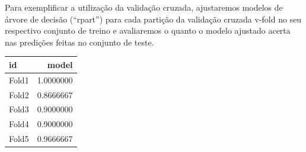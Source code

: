 \documentclass[
  a4paperpaper,
]{article}
\newenvironment{Shaded}{\begin{snugshade}}{\end{snugshade}}
\newcommand{\AttributeTok}[1]{\textcolor[rgb]{0.40,0.45,0.13}{#1}}
\newcommand{\CommentTok}[1]{\textcolor[rgb]{0.37,0.37,0.37}{#1}}
\newcommand{\FunctionTok}[1]{\textcolor[rgb]{0.28,0.35,0.67}{#1}}
\newcommand{\NormalTok}[1]{\textcolor[rgb]{0.00,0.23,0.31}{#1}}
\newcommand{\OtherTok}[1]{\textcolor[rgb]{0.00,0.23,0.31}{#1}}
\newcommand{\SpecialCharTok}[1]{\textcolor[rgb]{0.37,0.37,0.37}{#1}}
\newcommand{\StringTok}[1]{\textcolor[rgb]{0.13,0.47,0.30}{#1}}
\begin{document}
Para exemplificar a utilização da validação cruzada, ajustaremos modelos
de árvore de decisão (``rpart'') para cada partição da validação cruzada
v-fold no seu respectivo conjunto de treino e avaliaremos o quanto o
modelo ajustado acerta nas predições feitas no conjunto de teste.

\begin{Shaded}
\end{Shaded}

\begin{longtable}[]{@{}lr@{}}
\toprule\noalign{}
id & model \\
\midrule\noalign{}
\endhead
\bottomrule\noalign{}
\endlastfoot
Fold1 & 1.0000000 \\
Fold2 & 0.8666667 \\
Fold3 & 0.9000000 \\
Fold4 & 0.9000000 \\
Fold5 & 0.9666667 \\
\end{longtable}
\end{document}

